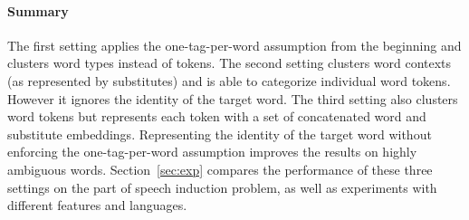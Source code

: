 \paragraph{Summary} The first setting applies the one-tag-per-word
assumption from the beginning and clusters word types instead of
tokens.  The second setting clusters word contexts (as represented by
substitutes) and is able to categorize individual word tokens.
However it ignores the identity of the target word.  The third setting
also clusters word tokens but represents each token with a set of
concatenated word and substitute embeddings.  Representing the
identity of the target word without enforcing the one-tag-per-word
assumption improves the results on highly ambiguous words.
Section~\ref{sec:exp} compares the performance of these three settings
on the part of speech induction problem, as well as experiments with
different features and languages.
